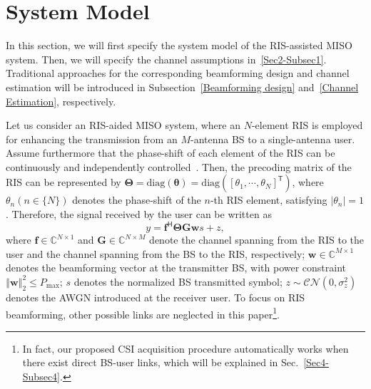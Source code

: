 \documentclass[journal,twocolumn]{IEEEtran}
\theoremstyle{nonumberplain}
\def \T {\bm \Theta}
\def \diag {\text{diag}}
\def \T {^{\mathsf{T}}}
\def \H {^{\mathsf{H}}}
\begin{document}
\section{System Model}  \label{System Model}
    In this section, we will first specify the system model of the RIS-assisted \ac{MISO} system.
    Then, we will specify the channel assumptions in~\ref{Sec2-Subsec1}. 
    Traditional approaches for the corresponding beamforming design and channel estimation will be introduced in Subsection~\ref{Beamforming design} and~\ref{Channel Estimation}, respectively.

    Let us consider an RIS-aided MISO system, where an $N$-element RIS is employed for enhancing the transmission from an $M$-antenna \ac{BS} to a single-antenna user. 
    Assume furthermore that the phase-shift of each element of the RIS can be continuously and independently controlled~\cite{wu2019intelligent}. Then, the precoding matrix of the RIS can be represented by $\bm \Theta = \diag \left(\bm \theta\right)=\diag \left(\left[\theta_{1},\cdots ,\theta_{N}\right]\T\right)$,
    where $\theta_n (n\in \{N\})$ denotes the phase-shift of the $n$-th RIS element, satisfying $\lvert \theta_n\rvert=1$. Therefore, the signal received by the user can be written as 
        \begin{equation}
            \label{Signal model}
            y=\bm f\H \bm\Theta \bm G \bm w s+z,
        \end{equation}
        where $\bm f\in \mathbb C ^{N\times 1}$ and $\bm G \in \mathbb C^{N\times M}$ denote the channel spanning from the RIS to the user and the channel spanning from the BS to the RIS, respectively; $\bm w\in \mathbb C^{M\times 1}$ denotes the beamforming vector at the transmitter BS, with power constraint $\left\Vert \bm w\right\Vert_{2}^{2}\leq P_{\text{max}}$; $s$ denotes the normalized BS transmitted symbol; $z\sim \mathcal{CN}\left(0,\sigma_{z}^{2}\right)$ denotes the \ac{AWGN} introduced at the receiver user. To focus on RIS beamforming, other possible links are neglected in this paper\footnote{In fact, our proposed CSI acquisition procedure automatically works when there exist direct BS-user links, which will be explained in Sec.~\ref{Sec4-Subsec4}.}.
\end{document}
